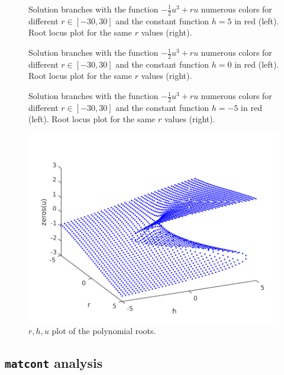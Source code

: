 \begin{figure}
\centering



\caption{Solution branches with the function $-\frac{1}{2} u^3 + ru $ numerous colors for different $r\in [-30,30]$ and the constant function $h=5$ in red (left). Root locus plot for the same $r$ values (right).}
\label{fig:one}



\caption{Solution branches with the function $-\frac{1}{2} u^3 + ru $ numerous colors for different $r\in [-30,30]$ and the constant function $h=0$ in red (left). Root locus plot for the same $r$ values (right).}
\label{fig:two}



\caption{Solution branches with the function $-\frac{1}{2} u^3 + ru $ numerous colors for different $r\in [-30,30]$ and the constant function $h=-5$ in red (left). Root locus plot for the same $r$ values (right).}
\label{fig:tree}
\includegraphics[scale = 0.5]{./plots/zerosrhu.pdf}
\caption{$r,h,u$ plot of the polynomial roots.}
\end{figure}

\newpage
\subsection{\texttt{matcont} analysis}
\begin{figure}


\end{figure}

